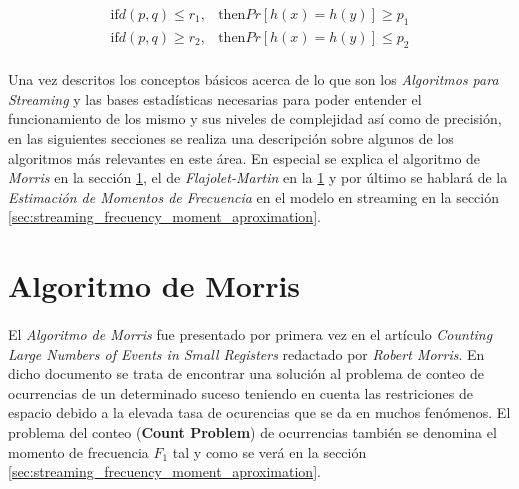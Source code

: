 \documentclass{subfiles}
\begin{document}
        \begin{align}
        \label{eq:hash_lsh}
          \text{if} d(p,q) \leq r_1, &\text{then} Pr[h(x) = h(y)] \geq p_1 \\
          \text{if} d(p,q) \geq r_2, &\text{then} Pr[h(x) = h(y)] \leq p_2
        \end{align}

      \paragraph{}
      Una vez descritos los conceptos básicos acerca de lo que son los \emph{Algoritmos para Streaming} y las bases estadísticas necesarias para poder entender el funcionamiento de los mismo y sus niveles de complejidad así como de precisión, en las siguientes secciones se realiza una descripción sobre algunos de los algoritmos más relevantes en este área. En especial se explica el algoritmo de \emph{Morris} en la sección \ref{sec:streaming_morris_algorithm}, el de \emph{Flajolet-Martin} en la \ref{sec:streaming_morris_algorithm} y por último se hablará de la \emph{Estimación de Momentos de Frecuencia} en el modelo en streaming en la sección \ref{sec:streaming_frecuency_moment_aproximation}.


    \section{Algoritmo de Morris}
    \label{sec:streaming_morris_algorithm}

      \paragraph{}
      El \emph{Algoritmo de Morris} fue presentado por primera vez en el artículo \emph{Counting Large Numbers of Events in Small Registers} \cite{morris1978counting} redactado por \emph{Robert Morris}. En dicho documento se trata de encontrar una solución al problema de conteo de ocurrencias de un determinado suceso teniendo en cuenta las restriciones de espacio debido a la elevada tasa de ocurencias que se da en muchos fenómenos. El problema del conteo (\textbf{Count Problem}) de ocurrencias también se denomina el momento de frecuencia $F_1$ tal y como se verá en la sección \ref{sec:streaming_frecuency_moment_aproximation}.
\end{document}
